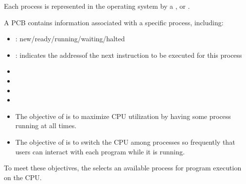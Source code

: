 
    \par Each process is represented in the operating system by a , or .
    \par A PCB contains information associated with a specific process,
    including:
      \begin{itemize}
        \item {}: new/ready/running/waiting/halted
        \item {}: indicates the addressof the next instruction to be executed for this process
        \item {}
        \item {}
        \item {}
        \item {}
      \end{itemize}



    \begin{itemize}
      \item The objective of  is to maximize CPU
        utilization by having some process running at all times.
      \item The objective of  is to switch the CPU among
        processes so frequently that users can interact with each program while
        it is running.
    \end{itemize}
    \par To meet these objectives, the  selects an
      available process for program execution on the CPU.

